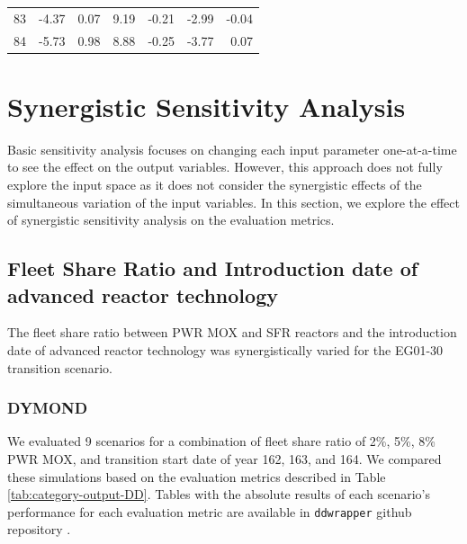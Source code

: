 \begin{table}[]
\begin{tabularx}{\textwidth}{R|RRRRRR}
            83  & -4.37            & 0.07                           & 9.19          & -0.21                       & -2.99             & -0.04                           \\
            84 & -5.73            & 0.98                           & 8.88          & -0.25                       & -3.77             & 0.07                           \\ \hline
           \end{tabularx}%

        \end{table}

\section{Synergistic Sensitivity Analysis}
\label{sec:synergistic}
Basic sensitivity analysis focuses on changing each input parameter one-at-a-time 
to see the effect on the output variables. 
However, this approach does not fully explore the input space as
it does not consider the synergistic effects of the simultaneous 
variation of the input variables.
In this section, we explore the effect of synergistic sensitivity 
analysis on the evaluation metrics.

\subsection{Fleet Share Ratio and Introduction date of advanced 
reactor technology}
The fleet share ratio between PWR MOX and SFR 
reactors and the introduction date of advanced reactor 
technology was synergistically varied for 
the EG01-30 transition scenario. 

\subsubsection{\textbf{DYMOND}}
We evaluated 9 scenarios for a combination of fleet share ratio of 
2\%, 5\%, 8\% PWR MOX, and transition start date of year 162, 163, and 164.
We compared these simulations based on the evaluation 
metrics described in Table \ref{tab:category-output-DD}.
Tables with the absolute results of each scenario's performance 
for each evaluation metric are available in  \texttt{ddwrapper} github repository 
\cite{chee_gwenchee/ddwrapper_2019}. 

